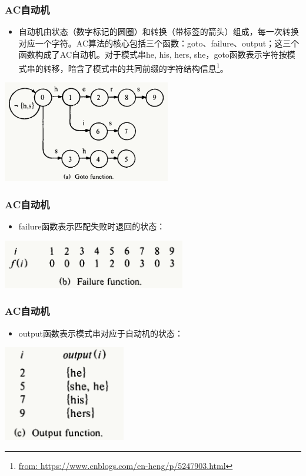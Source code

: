 \begin{frame}[fragile]
  \frametitle{AC自动机}
  \begin{itemize}
  \item 自动机由状态（数字标记的圆圈）和转换（带标签的箭头）组成，每一次转换对应一个字符。AC算法的核心包括三个函数：goto、failure、output；这三个函数构成了AC自动机。对于模式串{he, his, hers, she}，goto函数表示字符按模式串的转移，暗含了模式串的共同前缀的字符结构信息\footnote{\url{from: https://www.cnblogs.com/en-heng/p/5247903.html}}。
  \end{itemize}

  \begin{center}
  \includegraphics[width=0.55\textwidth]{figs/string/ac_goto.png}
  \end{center}
\end{frame}

\begin{frame}[fragile]
  \frametitle{AC自动机}
  \begin{itemize}
  \item failure函数表示匹配失败时退回的状态：
  \end{itemize}

  \begin{center}
  \includegraphics[width=0.6\textwidth]{figs/string/ac_failure.png}
  \end{center}
\end{frame}

\begin{frame}[fragile]
  \frametitle{AC自动机}
  \begin{itemize}
  \item output函数表示模式串对应于自动机的状态：
  \end{itemize}

  \begin{center}
  \includegraphics[width=0.4\textwidth]{figs/string/ac_output.png}
  \end{center}
\end{frame}

